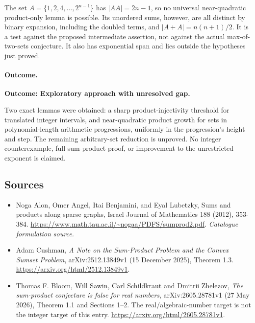 \documentclass[11pt,a4paper]{article}
\numberwithin{equation}{section}
\begin{document}
The set $A=\{1,2,4,\ldots,2^{n-1}\}$ has $|AA|=2n-1$, so no universal
near-quadratic product-only lemma is possible. Its unordered sums, however,
are all distinct by binary expansion, including the doubled terms, and
$|A+A|=n(n+1)/2$. It is a test against the proposed intermediate assertion,
not against the actual max-of-two-sets conjecture. It also has exponential
span and lies outside the hypotheses just proved.

\paragraph{Outcome.}
\textbf{Outcome: Exploratory approach with unresolved gap.}

Two exact lemmas were obtained: a sharp product-injectivity threshold for
translated integer intervals, and near-quadratic product growth for sets
in polynomial-length arithmetic progressions, uniformly in the progression's
height and step. The remaining arbitrary-set reduction is unproved.
No integer counterexample, full sum-product proof, or improvement to the
unrestricted exponent is claimed.
\subsection{Sources}
\begin{itemize}\raggedright
\item[\textnormal{[S1]}]\hypertarget{source:statement:1}{} Noga Alon, Omer Angel, Itai Benjamini, and Eyal Lubetzky, Sums and products along sparse graphs, Israel Journal of Mathematics 188 (2012), 353-384.
\url{https://www.math.tau.ac.il/~nogaa/PDFS/sumprod2.pdf}.
{\small\textit{Catalogue formulation source.}}
\item[\textnormal{[E1]}]\hypertarget{extra:statement:1}{} Adam Cushman,
\emph{A Note on the Sum-Product Problem and the Convex Sumset Problem},
arXiv:2512.13849v1 (15 December 2025), Theorem 1.3.
\url{https://arxiv.org/html/2512.13849v1}.
\item[\textnormal{[E2]}]\hypertarget{extra:statement:2}{} Thomas F. Bloom, Will Sawin,
Carl Schildkraut and Dmitrii Zhelezov,
\emph{The sum-product conjecture is false for real numbers},
arXiv:2605.28781v1 (27 May 2026), Theorem 1.1 and Sections 1--2.
The real/algebraic-number target is not the integer target of this entry.
\url{https://arxiv.org/html/2605.28781v1}.
\end{itemize}
\end{document}
